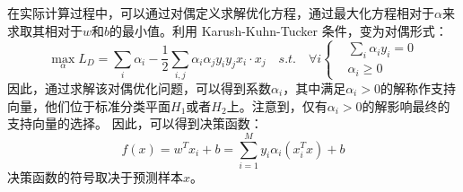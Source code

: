 在实际计算过程中，可以通过对偶定义求解优化方程，通过最大化方程相对于$\alpha$来求取其相对于$w$和$b$的最小值。利用 Karush-Kuhn-Tucker 条件，变为对偶形式：
\begin{equation}
	\max \limits_{\alpha} L_D=\sum_i{\alpha_i}-\frac{1}{2}\sum_{i,j}\alpha_i\alpha_jy_iy_jx_i\cdot x_j \quad s.t. \quad \forall i
	\left\{
		\begin{aligned}
	   &\sum_i{\alpha_iy_i}=0  \\
	   &\alpha_i \geq 0
	   \end{aligned}
		\right.
\end{equation}
因此，通过求解该对偶优化问题，可以得到系数$\alpha_i$，其中满足$\alpha_i>0$的解称作支持向量，他们位于标准分类平面$H_1$或者$H_2$上。注意到，仅有$\alpha_i>0$的解影响最终的支持向量的选择。
因此，可以得到决策函数：
\begin{equation}
	f(x)=w^Tx_i+b=\sum_{i=1}^My_i\alpha_i(x_i^Tx)+b
\end{equation}
决策函数的符号取决于预测样本$x$。

